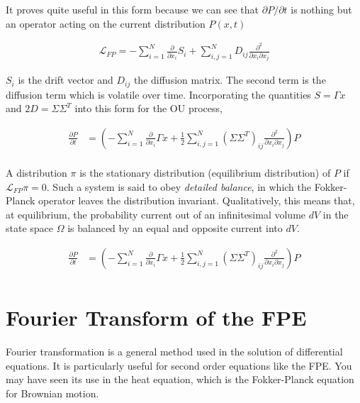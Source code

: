 \documentclass{article}
\begin{document}
It proves quite useful in this form because we can see that $\partial P/\partial t$ is nothing but an operator acting on the current distribution $P(x,t)$

\begin{align}
\mathcal{L}_{FP} = -\sum_{i=1}^{N}\frac{\partial}{\partial x_{i}} S_{i} + \sum_{i,j=1}^{N} D_{ij}\frac{\partial^{2}}{\partial x_{i}\partial x_{j}}
\end{align}

$S_{i}$ is the drift vector and $D_{ij}$ the diffusion matrix. The second term is the diffusion term which is volatile over time. Incorporating the quantities $S = \Gamma x$ and $2D = \Sigma\Sigma^{T}$ into this form for the OU process,

\begin{align}
\frac{\partial P}{\partial t}  &= \left(-\sum_{i=1}^{N}\frac{\partial}{\partial x_{i}}\Gamma x + \frac{1}{2}\sum_{i,j=1}^{N}(\Sigma\Sigma^{T})_{ij} \frac{\partial^{2}}{\partial x_{i}\partial x_{j}}\right)P\\
\end{align}

A distribution $\pi$ is the stationary distribution (equilibrium distribution) of $P$ if $\mathcal{L}_{FP}\pi = 0$. Such a system is said to obey \emph{detailed balance}, in which the Fokker-Planck operator leaves the distribution invariant. Qualitatively, this means that, at equilibrium, the probability current out of an infinitesimal volume $dV$ in the state space $\Omega$ is balanced by an equal and opposite current into $dV$. 

\begin{align}
\frac{\partial P}{\partial t}  &= \left(-\sum_{i=1}^{N}\frac{\partial}{\partial x_{i}}\Gamma x + \frac{1}{2}\sum_{i,j=1}^{N}(\Sigma\Sigma^{T})_{ij} \frac{\partial^{2}}{\partial x_{i}\partial x_{j}}\right)P\\
\end{align}

\section{Fourier Transform of the FPE}

Fourier transformation is a general method used in the solution of differential equations. It is particularly useful for second order equations like the FPE. You may have seen its use in the heat equation, which is the Fokker-Planck equation for Brownian motion.
\end{document}
